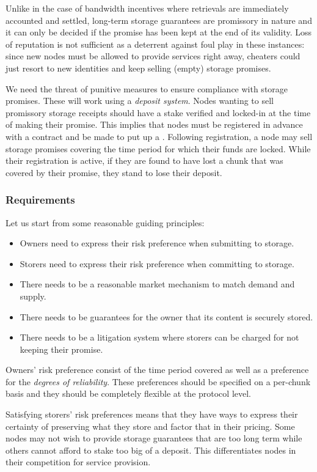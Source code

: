 Unlike in the case of bandwidth incentives where retrievals are immediately accounted and settled, long-term storage guarantees are promissory in nature and it can only be decided if the promise has been kept at the end of its validity. Loss of reputation is not sufficient as a deterrent against foul play in these instances: since new nodes must be allowed to provide services right away, cheaters could just resort to new identities and keep selling (empty) storage promises.

We need the threat of punitive measures to ensure compliance with storage promises. These will work using a \emph{deposit system}. Nodes wanting to sell promissory storage receipts should have a stake verified and locked-in at the time of making their promise. This implies that nodes must be registered in advance with a contract and be made to put up a . Following registration, a node may sell storage promises covering the time period for which their funds are locked. While their registration is active, if they are found to have lost a chunk that was covered by their promise, they stand to lose their deposit.

\subsubsection{Requirements}

Let us start from some reasonable guiding principles:

\begin{itemize}
\item Owners need to express their risk preference when submitting to storage.
\item Storers need to express their risk preference when committing to storage.
\item There needs to be a reasonable market mechanism to match demand and supply.
\item There needs to be guarantees for the owner that its content is securely stored.
\item There needs to be a litigation system where storers can be charged for not keeping their promise.
\end{itemize}

Owners' risk preference consist of the time period covered as well as a preference for the \emph{degrees of reliability}. These preferences should be specified on a per-chunk basis and they should be completely flexible at the protocol level.

Satisfying storers' risk preferences means that they have ways to express their certainty of preserving what they store and factor that in their pricing. Some nodes may not wish to provide storage guarantees that are too long term while others cannot afford to stake too big of a deposit. This differentiates nodes in their competition for service provision.

